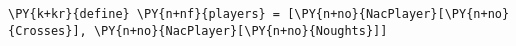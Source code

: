 \begin{Verbatim}[commandchars=\\\{\}]
\PY{k+kr}{define} \PY{n+nf}{players} = [\PY{n+no}{NacPlayer}[\PY{n+no}{Crosses}], \PY{n+no}{NacPlayer}[\PY{n+no}{Noughts}]]
\end{Verbatim}
